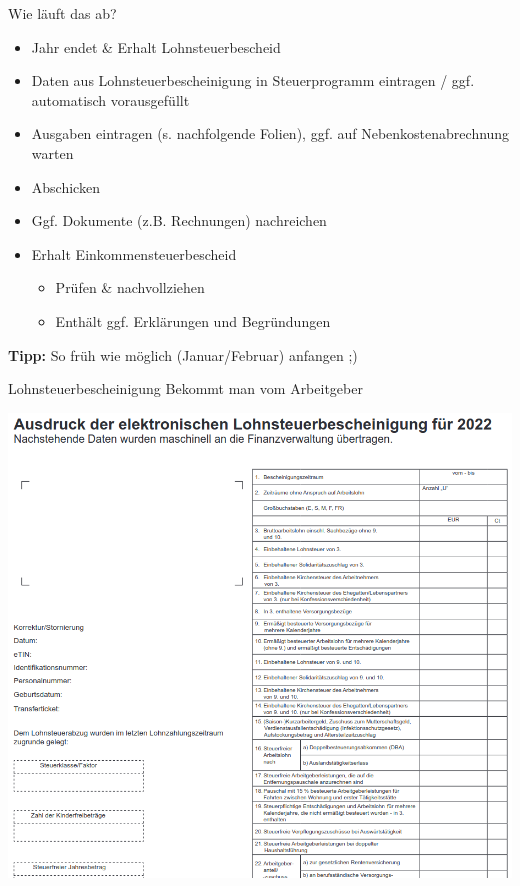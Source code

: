 \documentclass{beamer}
\begin{document}
			\begin{frame}{Wie läuft das ab?}
				\begin{itemize}
					\item Jahr endet \& Erhalt Lohnsteuerbescheid
					\item Daten aus Lohnsteuerbescheinigung in Steuerprogramm eintragen / ggf. automatisch vorausgefüllt
					\item Ausgaben eintragen (s. nachfolgende Folien), ggf. auf Nebenkostenabrechnung warten
					\item Abschicken
					\item Ggf. Dokumente (z.B. Rechnungen) nachreichen
					\item Erhalt Einkommensteuerbescheid
					\begin{itemize}
						\item Prüfen \& nachvollziehen
						\item Enthält ggf. Erklärungen und Begründungen
					\end{itemize}
				\end{itemize}\n
				\textbf{Tipp:} So früh wie möglich (Januar/Februar) anfangen ;)
			\end{frame}
		
			\begin{frame}{Lohnsteuerbescheinigung}{}
				{\tiny Bekommt man vom Arbeitgeber}
				\begin{center}
					\includegraphics[width=0.65\linewidth]{images/lohnsteuerbescheinigung}
				\end{center}
			\end{frame}
		
\end{document}
